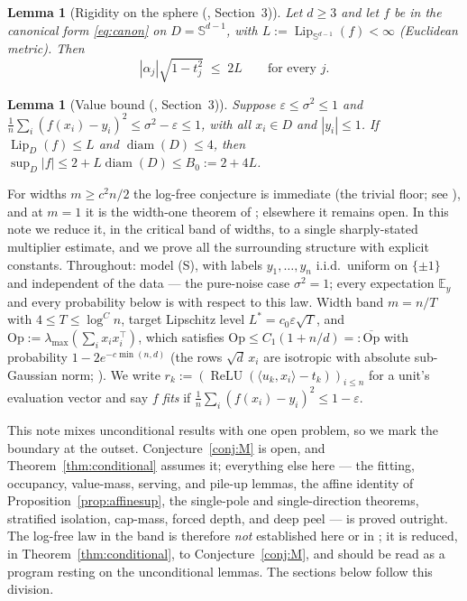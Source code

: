 \documentclass[11pt,reqno]{amsart}
\theoremstyle{plain}
\newtheorem{lemma}[theorem]{Lemma}
\theoremstyle{definition}
\theoremstyle{remark}
\newcommand{\Sd}{\mathbb{S}^{d-1}}
\newcommand{\EE}{\mathbb{E}}
\newcommand{\eps}{\varepsilon}
\newcommand{\Lip}{\operatorname{Lip}}
\newcommand{\relu}{\operatorname{ReLU}}
\newcommand{\inn}[2]{\langle #1,#2\rangle}
\begin{document}
\begin{lemma}[Rigidity on the sphere (\cite{paper}, Section~3)]\label{lem:rigidity-sphere}
Let $d\ge3$ and let $f$ be in the canonical form \eqref{eq:canon} on $D=\Sd$, with $L:=\Lip_{\Sd}(f)<\infty$ (Euclidean metric). Then
\[
|\alpha_j|\sqrt{1-t_j^2}\;\le\;2L\qquad\text{for every }j.
\]
\end{lemma}

\begin{lemma}[Value bound (\cite{paper}, Section~3)]\label{lem:B0}
Suppose $\eps\le\sigma^2\le1$ and $\frac1n\sum_i(f(x_i)-y_i)^2\le\sigma^2-\eps\le1$, with all $x_i\in D$ and $|y_i|\le1$. If $\Lip_D(f)\le L$ and $\operatorname{diam}(D)\le4$, then $\sup_D|f|\le2+L\operatorname{diam}(D)\le B_0:=2+4L$.
\end{lemma}

For widths $m\ge c^2n/2$ the log-free conjecture is immediate (the trivial floor; see \cite{paper}), and at $m=1$ it is the width-one theorem of \cite{paper}; elsewhere it remains open. In this note we reduce it, in the critical band of widths, to a single sharply-stated multiplier estimate, and we prove all the surrounding structure with explicit constants. Throughout: model (S), with labels $y_1,\dots,y_n$ i.i.d.\ uniform on $\{\pm1\}$ and independent of the data --- the pure-noise case $\sigma^2=1$; every expectation $\EE_y$ and every probability below is with respect to this law. Width band $m=n/T$ with $4\le T\le\log^Cn$, target Lipschitz level $L^\ast=c_0\eps\sqrt T$, and $\mathrm{Op}:=\lambda_{\max}(\sum_ix_ix_i^\top)$, which satisfies $\mathrm{Op}\le C_1(1+n/d)=:\overline{\mathrm{Op}}$ with probability $1-2e^{-c\min(n,d)}$ (the rows $\sqrt d\,x_i$ are isotropic with absolute sub-Gaussian norm; \cite[Thm.~4.6.1]{Vershynin}). We write $r_k:=(\relu(\inn{u_k}{x_i}-t_k))_{i\le n}$ for a unit's evaluation vector and say $f$ \emph{fits} if $\frac1n\sum_i(f(x_i)-y_i)^2\le1-\eps$.

This note mixes unconditional results with one open problem, so we mark the boundary at the outset. Conjecture~\ref{conj:M} is open, and Theorem~\ref{thm:conditional} assumes it; everything else here --- the fitting, occupancy, value-mass, serving, and pile-up lemmas, the affine identity of Proposition~\ref{prop:affinesup}, the single-pole and single-direction theorems, stratified isolation, cap-mass, forced depth, and deep peel --- is proved outright. The log-free law in the band is therefore \emph{not} established here or in \cite{paper}; it is reduced, in Theorem~\ref{thm:conditional}, to Conjecture~\ref{conj:M}, and should be read as a program resting on the unconditional lemmas. The sections below follow this division.
\end{document}
